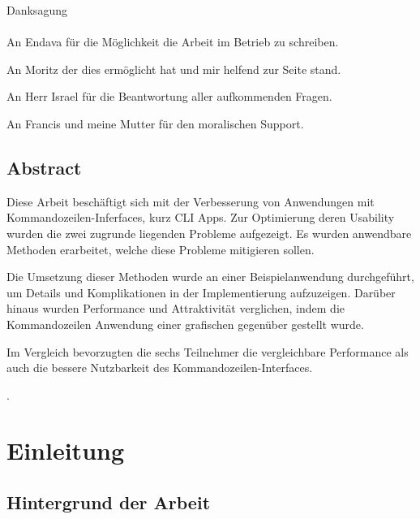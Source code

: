 \documentclass[oneside,bibliography=totocnumbered,BCOR=5mm]{scrbook}
\begin{document}
\thispagestyle{empty}
\vspace*{2.2cm}
\noindent
{\Huge Danksagung}\\
\vspace*{1.6cm} \\


An Endava für die Möglichkeit die Arbeit im Betrieb zu schreiben.

\medskip

An Moritz der dies ermöglicht hat und mir helfend zur Seite stand.

\medskip

An Herr Israel für die Beantwortung aller aufkommenden Fragen.

\medskip

An Francis und meine Mutter für den moralischen Support.

\newpage
\thispagestyle{empty}

\section*{Abstract}

Diese Arbeit beschäftigt sich mit der Verbesserung von Anwendungen mit
Kommandozeilen-Inferfaces, kurz CLI Apps. Zur Optimierung deren Usability wurden
die zwei zugrunde liegenden Probleme aufgezeigt. Es wurden anwendbare Methoden
erarbeitet, welche diese Probleme mitigieren sollen.

Die Umsetzung dieser Methoden wurde an einer Beispielanwendung durchgeführt, um
Details und Komplikationen in der Implementierung aufzuzeigen. Darüber hinaus
wurden Performance und Attraktivität verglichen, indem die Kommandozeilen
Anwendung einer grafischen gegenüber gestellt wurde.

Im Vergleich bevorzugten die sechs Teilnehmer die vergleichbare Performance als
auch die bessere Nutzbarkeit des Kommandozeilen-Interfaces.

\clearpage
{}
\tableofcontents
.
\newpage

\chapter{Einleitung}
\label{sec:einleitung}

\section{Hintergrund der Arbeit}
\end{document}
